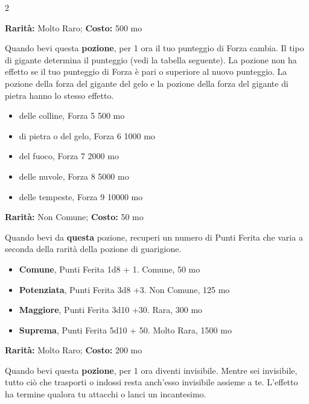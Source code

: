\begin{multicols}{2}

\textbf{Rarità:} Molto Raro; \textbf{Costo:} 500 mo

Quando bevi questa \textbf{pozione}, per 1 ora il tuo punteggio di Forza cambia. Il tipo di gigante determina il punteggio (vedi la tabella seguente). La pozione non ha effetto se il tuo punteggio di Forza è pari o superiore al nuovo punteggio. La pozione della forza del gigante del gelo e la pozione della forza del gigante di pietra hanno lo stesso effetto.

\begin{itemize} \setlength\itemsep{0em}
\item delle colline, Forza 5 500 mo
\item di pietra o del gelo, Forza 6 1000 mo
\item del fuoco, Forza 7 2000 mo
\item delle nuvole, Forza 8 5000 mo
\item delle tempeste, Forza 9 10000 mo
\end{itemize}


\textbf{Rarità:} Non Comune; \textbf{Costo:} 50 mo

Quando bevi da \textbf{questa} pozione, recuperi un numero di Punti Ferita che varia a seconda della rarità della pozione di guarigione.

\begin{itemize} \setlength\itemsep{0em}
\item \textbf{Comune}, Punti Ferita 1d8 + 1. Comune, 50 mo
\item \textbf{Potenziata}, Punti Ferita 3d8 +3. Non Comune, 125 mo
\item \textbf{Maggiore}, Punti Ferita 3d10 +30. Rara, 300 mo
\item \textbf{Suprema}, Punti Ferita 5d10 + 50. Molto Rara, 1500 mo
\end{itemize}


\textbf{Rarità:} Molto Raro; \textbf{Costo:} 200 mo

Quando bevi questa \textbf{pozione}, per 1 ora diventi invisibile. Mentre sei invisibile, tutto ciò che trasporti o indossi resta anch'esso invisibile assieme a te. L'effetto ha termine qualora tu attacchi o lanci un incantesimo.



\end{multicols}
